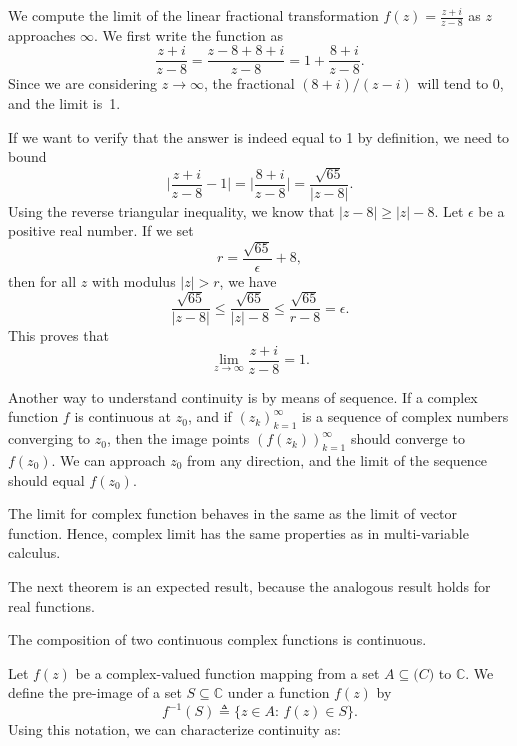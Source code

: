 \begin{example}
	We compute the limit of the linear fractional transformation $f(z) = \frac{z+i}{z-8}$ as $z$ approaches $\infty$.  We first write the function as
	$$
	\frac{z+i}{z-8} = 
	\frac{z-8+8+i}{z-8}= 1 + \frac{8+i}{z-8}.
	$$
	Since we are considering $z\rightarrow \infty$, the fractional $(8+i)/(z-i)$ will tend to 0, and the limit is~1.
	
	If we want to verify that the answer is indeed equal to 1 by definition, we need to bound
	$$
	\Big| \frac{z+i}{z-8} -  1\Big| =
	\Big| \frac{8+i}{z-8}\Big| = \frac{\sqrt{65}}{|z-8|}.
	$$
	Using the reverse triangular inequality, we know that $|z-8| \geq |z|-8$. Let $\epsilon$ be a positive real number. If we set 
	$$
	r = \frac{\sqrt{65}}{\epsilon}+8,
	$$
	then for all $z$ with modulus $|z|>r$, we have
	$$
	\frac{\sqrt{65}}{|z-8|} \leq
	\frac{\sqrt{65}}{|z|-8} \leq
	\frac{\sqrt{65}}{r-8} = \epsilon.
	$$
	This proves that
	$$
	\lim_{z\rightarrow \infty} \frac{z+i}{z-8} = 1.
	$$
\end{example}



Another way to understand continuity is by means of sequence. If a complex function $f$ is continuous at $z_0$, and if $(z_k)_{k=1}^\infty$ is a sequence of complex numbers converging to $z_0$, then the image points $(f(z_k))_{k=1}^\infty$ should converge to $f(z_0)$. We can approach $z_0$ from any direction, and the limit of the sequence should equal $f(z_0)$.



The limit for complex function behaves in the same as the limit of vector function. Hence, complex limit has the same properties as in multi-variable calculus.  


The next theorem is an expected result, because the analogous result holds for real functions.

\begin{svgraybox}
	\begin{theorem}
		The composition of two continuous complex functions is continuous.
	\end{theorem}
\end{svgraybox}


Let $f(z)$ be a complex-valued function mapping from a set $A \subseteq \mathbb(C)$ to $\mathbb{C}$.
We define the pre-image of a set $S\subseteq \mathbb{C}$ under a function $f(z)$ by
$$
f^{-1}(S) \triangleq \{z \in A:\, f(z) \in S\}.
$$
Using this notation, we can characterize continuity as:

